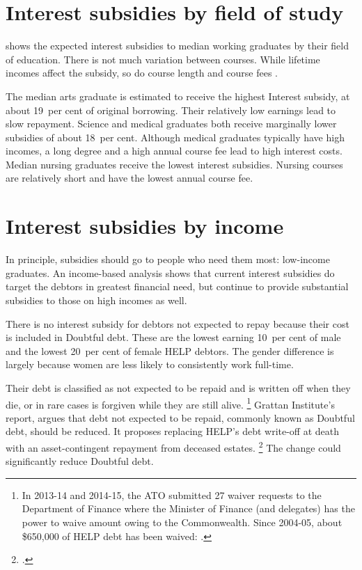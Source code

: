 \documentclass[embargoed]{grattan}
\begin{document}
\section{Interest subsidies by field of study}\label{interest-subsidies-by-field-of-study}

 shows the expected interest subsidies to median working graduates by their field of education. There is not much variation between courses. While lifetime incomes affect the subsidy, so do course length and course fees .

The median arts graduate is estimated to receive the highest \gls{Interest subsidy}, at about 19~per cent of original borrowing.
Their relatively low earnings lead to slow repayment.
Science and medical graduates both receive marginally lower subsidies of about 18~per cent.
Although medical graduates typically have high incomes, a long degree and a high annual course fee lead to high interest costs.
Median nursing graduates receive the lowest interest subsidies.
Nursing courses are relatively short and have the lowest annual course fee.

\section{Interest subsidies by income}\label{sec:interest-subsidies-by-income}

In principle, subsidies should go to people who need them most: low-income graduates.
An income-based analysis shows that current interest subsidies do target the debtors in greatest financial need, but continue to provide substantial subsidies to those on high incomes as well.

There is no interest subsidy for debtors not expected to repay because their cost is included in \gls{Doubtful debt}.
These are the lowest earning 10~per cent of male and the lowest 20~per cent of female \gls{HELP} debtors.
The gender difference is largely because women are less likely to consistently work full-time.

Their debt is classified as not expected to be repaid and is written off when they die, or in rare cases is forgiven while they are still alive.%
\footnote{In 2013-14 and 2014-15, the \gls{ATO} submitted 27 waiver requests to the Department of Finance where the Minister of Finance (and delegates) has the power to waive amount owing to the Commonwealth.
Since 2004-05, about \$650,000 of \gls{HELP} debt has been waived: \textcite[][38]{ANAO2016AdministrationHigherEducation}.} Grattan Institute's \citeyear{Norton2014Doubtfuldebtrising} report,  argues that debt not expected to be repaid, commonly known as \gls{Doubtful debt}, should be reduced.
It proposes replacing \gls{HELP}'s debt write-off at death with an asset-contingent repayment from deceased estates.%
\footcite{Norton2014Doubtfuldebtrising} 
The change could significantly reduce \gls{Doubtful debt}.
\end{document}
